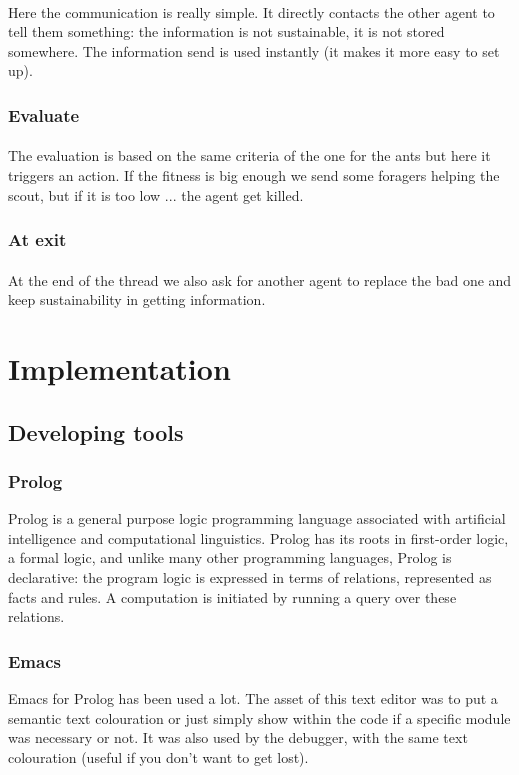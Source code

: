 \documentclass{article}
\begin{document}
			\paragraph{}
				Here the communication is really simple.
				It directly contacts the other agent to tell them something:
				the information is not sustainable, it is not stored somewhere.
				The information send is used instantly (it makes it more easy to set up).
		\subsubsection{Evaluate}
			\paragraph{}
				The evaluation is based on the same criteria of the one for the ants but here it triggers an action.
				If the fitness is big enough we send some foragers helping the scout, but if it is too low ... the agent get killed.
		\subsubsection{At exit}
			\paragraph{}
				At the end of the thread we also ask for another agent to replace the bad one and keep sustainability in getting information.

\section{Implementation}
	\subsection{Developing tools}
		\subsubsection{Prolog}
			Prolog is a general purpose logic programming language associated with artificial intelligence and computational linguistics.
			Prolog has its roots in first-order logic, a formal logic, and unlike many other programming languages,
			Prolog is declarative: the program logic is expressed in terms of relations, represented as facts and rules.
			A computation is initiated by running a query over these relations.
		\subsubsection{Emacs}
			Emacs for Prolog has been used a lot.
			The asset of this text editor was to put a semantic text colouration
			or just simply show within the code if a specific module was necessary or not.
			It was also used by the debugger, with the same text colouration (useful if you don't want to get lost).
\end{document}
